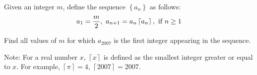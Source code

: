 Given an integer $ m$,  define the sequence $ \left\{a_{n}\right\}$ as follows:\[ a_{1}=\frac{m}{2},\ a_{n+1}=a_{n}\left\lceil a_{n}\right\rceil,\textnormal{ if }n\geq 1\]

Find all values of $ m$ for which $ a_{2007}$ is the first integer appearing in the sequence.

Note: For a real number $ x$,  $ \left\lceil x\right\rceil$ is defined as the smallest integer greater or equal to $ x$. For example, $ \left\lceil\pi\right\rceil=4$,  $ \left\lceil 2007\right\rceil=2007$.